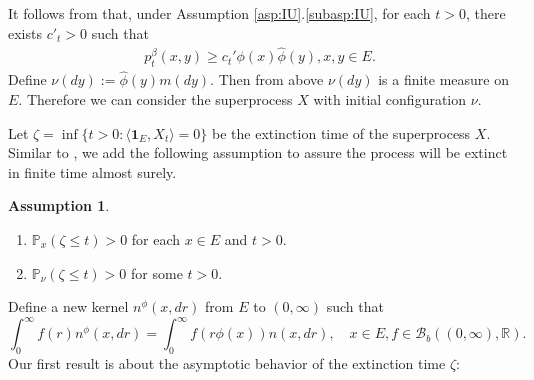 \documentclass[12pt,a4paper]{amsart}
\numberwithin{equation}{section}
\theoremstyle{plain}
\theoremstyle{definition}
\newtheorem{asp}{Assumption}
\begin{document}
\begin{comment}
In the cases of $\lambda\leq 0,$ it is proved by \cite{EnglanderKyprianou2004Local} that $\lim_{t\rightarrow\infty} \langle
\mathbf 1_E,X_t\rangle=0 $ in probability.
({\bf ZS: Do we necessarily have to cite \cite{EnglanderKyprianou2004Local} here? I think
  \cite{EnglanderKyprianou2004Local} only considered the homogenious branching
  superdifussions, and it focused on the local extinction. It is hard to see
  where it proved this statement. If in our prove we don't use the result that
  $\langle \mathbf 1_E,X_t\rangle=0$, then we don't have to cite this paper
  here.}) {\color{red} I prefer to keeping this result here.} But this is not
equivalent to
\begin{equation}\label{eq:p1extinc}
	\mathbb P_\mu(\zeta<\infty)=1.
\end{equation}
If the branching mechanism $\psi$ is independent of the location $x$, then
\eqref{eq:p1extinc} holds provided condition \eqref{eq:_extinc_assump_for_continuous}
is true. 
\end{comment}


It follows from \cite[Proposition 2.5]{KimSong2008Intrinsic} that, under Assumption \ref{asp:IU}.\eqref{subasp:IU}, for each $t>0$, there exists $c'_t > 0$ such that 
\begin{align}
	p^\beta_t (x,y) 
  \geq c_t' \phi(x) \widehat \phi(y),
  x,y \in E.
\end{align}
Define $\nu(dy):= \widehat \phi(y) m(dy)$. 
Then from above $\nu(dy)$ is a finite measure on $E$.
Therefore we can consider the superprocess $X$ with initial configuration $\nu$.
  
Let $\zeta=\inf\{t>0: \langle \mathbf 1_E,X_t\rangle=0\}$ be the extinction time of the superprocess $X$.
Similar to \cite{RenSongSun2019Spine,RenSongZhang2018Williams}, we add the following assumption to assure the process will be extinct in finite time almost surely.
\begin{asp} 
\label{asp:3}
~
  \begin{enumerate}
  \item \label{subsup:point_non_presistence}
    $\mathbb P_{x}(\zeta \leq t)>0$ for each $x\in E$ and $t>0$.
  \item \label{subasp:measure_non_presistence}
    $\mathbb P_{\nu}(\zeta\leq t)>0$ for some $t>0$.
  \end{enumerate}
\end{asp}
\par
Define a new kernel $n^\phi(x, dr)$ from $E$ to $(0,\infty)$ such that
\begin{equation} \label{eq:phi_change}
	\int_0^\infty f(r)n^\phi(x,dr)=\int_0^\infty f(r\phi(x))n(x, dr),
	\quad x\in E, f\in \mathcal B_b((0,\infty), \mathbb R).
\end{equation}
Our first result is about the asymptotic behavior of the extinction time $\zeta$:
\end{document}
